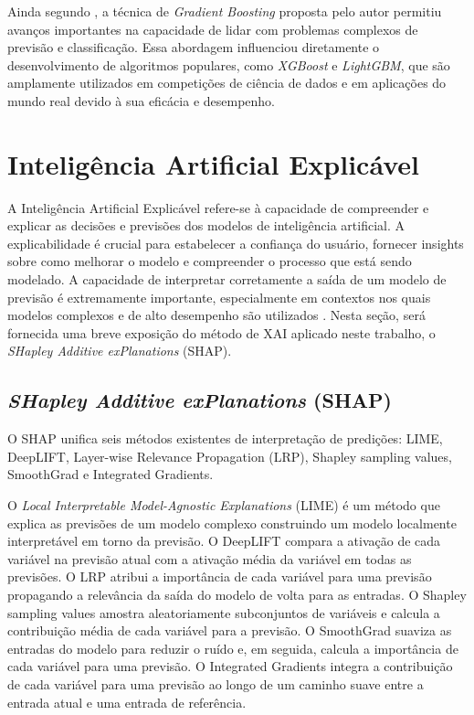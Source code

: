 Ainda segundo , a técnica de \textit{Gradient Boosting} proposta pelo autor permitiu avanços importantes na capacidade de lidar com problemas complexos de previsão e classificação. Essa abordagem influenciou diretamente o desenvolvimento de algoritmos populares, como \textit{XGBoost} e \textit{LightGBM}, que são amplamente utilizados em competições de ciência de dados e em aplicações do mundo real devido à sua eficácia e desempenho.

\section{Inteligência Artificial Explicável}

A Inteligência Artificial Explicável refere-se à capacidade de compreender e explicar as decisões e previsões dos modelos de inteligência artificial. A explicabilidade é crucial para estabelecer a confiança do usuário, fornecer insights sobre como melhorar o modelo e compreender o processo que está sendo modelado. A capacidade de interpretar corretamente a saída de um modelo de previsão é extremamente importante, especialmente em contextos nos quais modelos complexos e de alto desempenho são utilizados \cite{Shap2017}. Nesta seção, será fornecida uma breve exposição do método de XAI aplicado neste trabalho, o \textit{SHapley Additive exPlanations} (SHAP).

\subsection{\textit{SHapley Additive exPlanations} (SHAP)}\label{sec:shap}

O SHAP \cite{Shap2017} unifica seis métodos existentes de interpretação de predições: LIME, DeepLIFT, Layer-wise Relevance Propagation (LRP), Shapley sampling values, SmoothGrad e Integrated Gradients.

O \textit{Local Interpretable Model-Agnostic Explanations} (LIME) \cite{Lime2016} é um método que explica as previsões de um modelo complexo construindo um modelo localmente interpretável em torno da previsão. O DeepLIFT \cite{Deeplift} compara a ativação de cada variável na previsão atual com a ativação média da variável em todas as previsões. O LRP \cite{LRP2015} atribui a importância de cada variável para uma previsão propagando a relevância da saída do modelo de volta para as entradas. O Shapley sampling values \cite{Strumbelj2014} amostra aleatoriamente subconjuntos de variáveis e calcula a contribuição média de cada variável para a previsão. O SmoothGrad \cite{SmoothGrad} suaviza as entradas do modelo para reduzir o ruído e, em seguida, calcula a importância de cada variável para uma previsão. O Integrated Gradients \cite{IntegratedGradients} integra a contribuição de cada variável para uma previsão ao longo de um caminho suave entre a entrada atual e uma entrada de referência.

